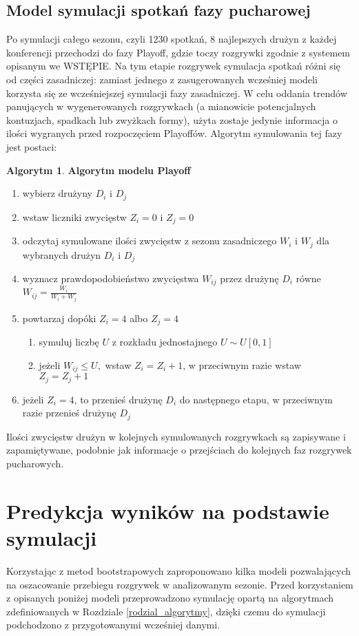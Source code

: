 \documentclass[inzynierska]{pwr_wmat_praca_dyplomowa}
\theoremstyle{plain}
\numberwithin{theorem}{chapter}
\theoremstyle{definition}
\numberwithin{theorem}{chapter}
\newtheorem{algorytm}[theorem]{Algorytm}
\begin{document}
\subsection{Model symulacji spotkań fazy pucharowej}
Po symulacji całego sezonu, czyli 1230 spotkań, 8 najlepszych drużyn z każdej konferencji przechodzi do fazy Playoff, gdzie toczy rozgrywki zgodnie z systemem opisanym we WSTĘPIE. Na tym etapie rozgrywek symulacja spotkań różni się od części zasadniczej: zamiast jednego z zasugerowanych wcześniej modeli korzysta się ze wcześniejszej symulacji fazy zasadniczej. W celu oddania trendów panujących w wygenerowanych rozgrywkach (a mianowicie potencjalnych kontuzjach, spadkach lub zwyżkach formy), użyta zostaje jedynie informacja o ilości wygranych przed rozpoczęciem Playoffów. Algorytm symulowania tej fazy jest postaci: 

\begin{algorytm} \textbf{Algorytm modelu Playoff}
	\begin{enumerate}
		\item wybierz drużyny $D_i$ i $D_j$
		\item wstaw liczniki zwycięstw $Z_i=0$ i $Z_j=0$
		\item odczytaj symulowane ilości zwycięstw z sezonu zasadniczego $W_i$ i $W_j$ dla wybranych drużyn $D_i$ i $D_j$
		\item wyznacz prawdopodobieństwo zwycięstwa $W_{ij}$ przez drużynę  $D_i$ równe $W_{ij}=\frac{W_i}{W_i + W_j}$
		\item powtarzaj dopóki  $Z_i=4$ albo $Z_j=4$
		\begin{enumerate}
			\item symuluj liczbę $U$ z rozkładu jednostajnego $U\sim U[0,1]$ 
			\item jeżeli $W_{ij} \leq U,$ wstaw $Z_i=Z_i+1$, w przeciwnym razie wstaw $Z_j=Z_j+1$
		\end{enumerate}
		\item jeżeli $Z_i=4$, to przenieś drużynę $D_i$ do następnego etapu, w przeciwnym razie przenieś drużynę $D_j$
	\end{enumerate}
\end{algorytm} 

Ilości zwycięstw drużyn w kolejnych symulowanych rozgrywkach są zapisywane i zapamiętywane, podobnie jak informacje o przejściach do kolejnych faz rozgrywek pucharowych. 

\section{Predykcja wyników na podstawie symulacji}
Korzystając z metod bootstrapowych zaproponowano kilka modeli pozwalających na oszacowanie przebiegu rozgrywek w analizowanym sezonie.
Przed korzystaniem z opisanych poniżej modeli przeprowadzono symulację opartą na algorytmach zdefiniowanych w Rozdziale \ref{rodzial_algorytmy}, dzięki czemu do symulacji podchodzono z przygotowanymi wcześniej danymi.
\end{document}

